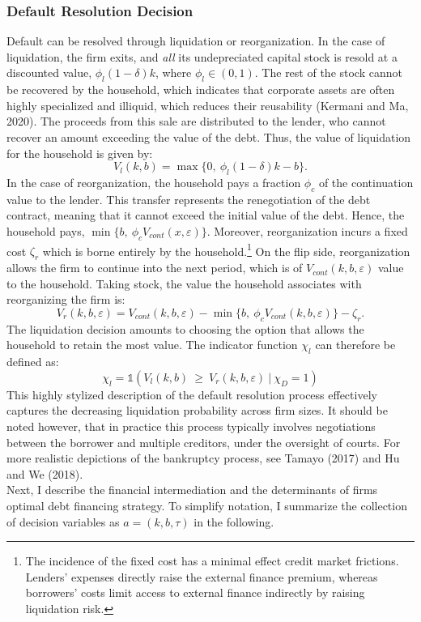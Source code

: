 \documentclass[12pt]{article}
\begin{document}
\subsubsection{Default Resolution Decision} \label{sec:default resolution}
Default can be resolved through liquidation or reorganization. In the case of liquidation, the firm exits, and \textit{all} its undepreciated capital stock is resold at a discounted value, $\phi_l(1-\delta)k$, where $\phi_l \in (0,1)$. The rest of the stock cannot be recovered by the household, which indicates that corporate assets are often highly specialized and illiquid, which reduces their reusability (Kermani and Ma, 2020). The proceeds from this sale are distributed to the lender, who cannot recover an amount exceeding the value of the debt. Thus, the value of liquidation for the household is given by:
\begin{equation}
    V_{l}(k, b) = \max \{ 0, \ \phi_l(1-\delta)k - b  \}.
\end{equation}
In the case of reorganization, the household pays a fraction $\phi_c$ of the continuation value to the lender. This transfer represents the renegotiation of the debt contract, meaning that it cannot exceed the initial value of the debt. Hence, the household pays, $\min\{b, \ \phi_c V_{cont}(x,\varepsilon) \}$. Moreover, reorganization incurs a fixed cost $\zeta_r$ which is borne entirely by the household.\footnote{The incidence of the fixed cost has a minimal effect credit market frictions. Lenders' expenses directly raise the external finance premium, whereas borrowers' costs limit access to external finance indirectly by raising liquidation risk.} On the flip side, reorganization allows the firm to continue into the next period, which is of $V_{cont}(k,b,\varepsilon)$ value to the household. Taking stock, the value the household associates with reorganizing the firm is: 
\begin{equation}
    V_{r}(k, b, \varepsilon) = V_{cont}(k,b,\varepsilon) - \min\{b, \ \phi_c V_{cont}(k,b,\varepsilon) \} - \zeta_r.
\end{equation}
The liquidation decision amounts to choosing the option that allows the household to retain the most value. The indicator function $\chi_l$ can therefore be defined as:
\begin{equation} \label{eq:liquidation decision}
    \chi_l =  \mathds{1}( V_l(k, b)  \ \geq \ V_r(k, b, \varepsilon) \ | \ \chi_{D} = 1)  
\end{equation}
This highly stylized description  of the default resolution process effectively captures the decreasing liquidation probability across firm sizes. It should be noted however, that in practice this process typically involves negotiations between the borrower and multiple creditors, under the oversight of courts. For more realistic depictions of the bankruptcy process, see Tamayo (2017) and Hu and We (2018). \vspace{3mm} \\
Next, I describe the financial intermediation and the determinants of firms optimal debt financing strategy. To simplify notation, I summarize the collection of decision variables as $a = (k, b, \tau) $ in the following. 
\end{document}
